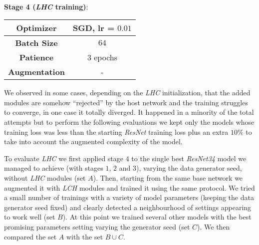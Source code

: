 \documentclass[fleqn,10pt]{SelfArx}
\begin{document}
\

\textbf{Stage 4 (\textit{LHC} training)}:

\begin{center}
\begin{tabular}{||c c||}  
 \hline
 \textbf{Optimizer} & SGD, lr = $0.01$ \\ 
 \hline
 \textbf{Batch Size} & $64$ \\
 \hline
 \textbf{Patience} & $3$ epochs \\
 \hline
 \textbf{Augmentation} & - \\
 \hline
\end{tabular}
\end{center}
We observed in some cases, depending on the \textit{LHC} initialization, that the added modules are somehow ``rejected'' by the host network and the training struggles to converge, in one case it totally diverged.
It happened in a minority of the total attempts but to perform the following evaluations we kept only the models whose training loss was less than the starting \textit{ResNet} training loss plus an extra $10\%$ to take into account the augmented complexity of the model.

To evaluate \textit{LHC} we first applied stage $4$ to the single best \textit{ResNet34} model we managed to achieve (with stages $1$, $2$ and $3$), varying the data generator seed, without \textit{LHC} modules (set $A$). Then, starting from the same base network we augmented it with \textit{LCH} modules and trained it using the same protocol. We tried a small number of trainings with a variety of model parameters (keeping the data generator seed fixed) and clearly detected a neighbourhood of settings appearing to work well (set $B$). At this point we trained several other models with the best promising parameters setting varying the generator seed (set $C$). We then compared the set $A$ with the set $B \cup C$.
\end{document}
